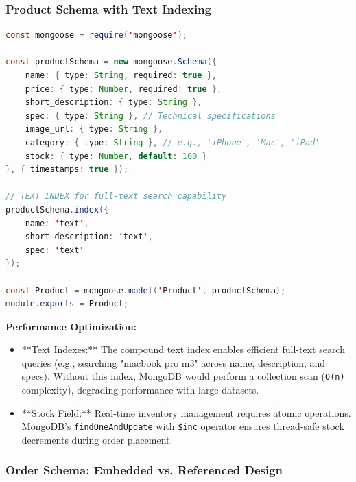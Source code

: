\documentclass[12pt, a4paper]{report}
\begin{document}
\subsubsection{Product Schema with Text Indexing}

\begin{lstlisting}[language=Java, caption=Product Schema with Search Optimization (model/Product.js)]
const mongoose = require('mongoose');

const productSchema = new mongoose.Schema({
    name: { type: String, required: true },
    price: { type: Number, required: true },
    short_description: { type: String },
    spec: { type: String }, // Technical specifications
    image_url: { type: String },
    category: { type: String }, // e.g., 'iPhone', 'Mac', 'iPad'
    stock: { type: Number, default: 100 }
}, { timestamps: true });

// TEXT INDEX for full-text search capability
productSchema.index({
    name: 'text',
    short_description: 'text',
    spec: 'text'
});

const Product = mongoose.model('Product', productSchema);
module.exports = Product;
\end{lstlisting}

\textbf{Performance Optimization:}
\begin{itemize}
    \item **Text Indexes:** The compound text index enables efficient full-text search queries (e.g., searching "macbook pro m3" across name, description, and specs). Without this index, MongoDB would perform a collection scan (\texttt{O(n)} complexity), degrading performance with large datasets.
    \item **Stock Field:** Real-time inventory management requires atomic operations. MongoDB's \texttt{findOneAndUpdate} with \texttt{\$inc} operator ensures thread-safe stock decrements during order placement.
\end{itemize}

\subsubsection{Order Schema: Embedded vs. Referenced Design}
\end{document}
